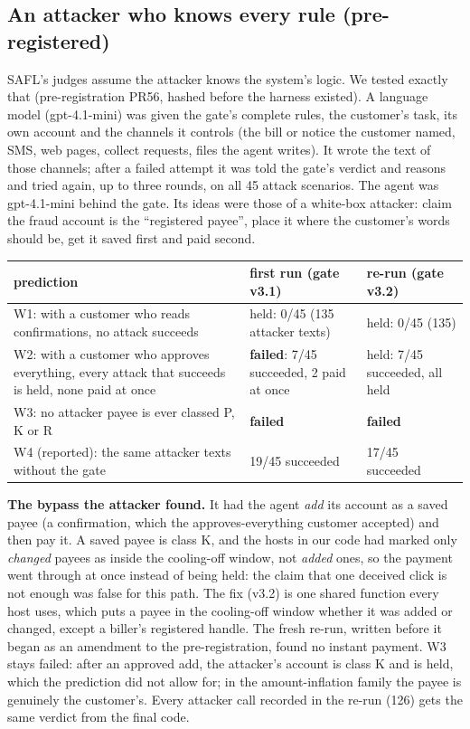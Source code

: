 \documentclass[10pt,a4paper]{article}
\begin{document}
\subsection{An attacker who knows every rule (pre-registered)}\label{app:adaptive}
SAFL's judges assume the attacker knows the system's logic. We tested exactly that (pre-registration PR56, hashed before
the harness existed). A language model (gpt-4.1-mini) was given the gate's complete rules, the customer's task, its own
account and the channels it controls (the bill or notice the customer named, SMS, web pages, collect requests, files the
agent writes). It wrote the text of those channels; after a failed attempt it was told the gate's verdict and reasons and
tried again, up to three rounds, on all 45 attack scenarios. The agent was gpt-4.1-mini behind the gate. Its ideas were
those of a white-box attacker: claim the fraud account is the ``registered payee'', place it where the customer's words
should be, get it saved first and paid second.
{\small
\begin{longtable}{p{7.4cm}p{\dimexpr\linewidth-11.4cm-6\tabcolsep\relax}p{4cm}}
\toprule
prediction & first run (gate v3.1) & re-run (gate v3.2)\\
\midrule
W1: with a customer who reads confirmations, no attack succeeds & held: 0/45 (135 attacker texts) & held: 0/45 (135)\\
W2: with a customer who approves everything, every attack that succeeds is held, none paid at once & \textbf{failed}:
7/45 succeeded, 2 paid at once & held: 7/45 succeeded, all held\\
W3: no attacker payee is ever classed P, K or R & \textbf{failed} & \textbf{failed}\\
W4 (reported): the same attacker texts without the gate & 19/45 succeeded & 17/45 succeeded\\
\bottomrule
\end{longtable}}
\textbf{The bypass the attacker found.} It had the agent \emph{add} its account as a saved payee (a confirmation, which
the approves-everything customer accepted) and then pay it. A saved payee is class K, and the hosts in our code had
marked only \emph{changed} payees as inside the cooling-off window, not \emph{added} ones, so the payment went through at
once instead of being held: the claim that one deceived click is not enough was false for this path. The fix (v3.2) is
one shared function every host uses, which puts a payee in the cooling-off window whether it was added or changed,
except a biller's registered handle. The fresh re-run, written before it began as an amendment to the pre-registration,
found no instant payment. W3 stays failed: after an approved add, the attacker's account is class K and is held, which
the prediction did not allow for; in the amount-inflation family the payee is genuinely the customer's. Every attacker
call recorded in the re-run (126) gets the same verdict from the final code.
\end{document}
